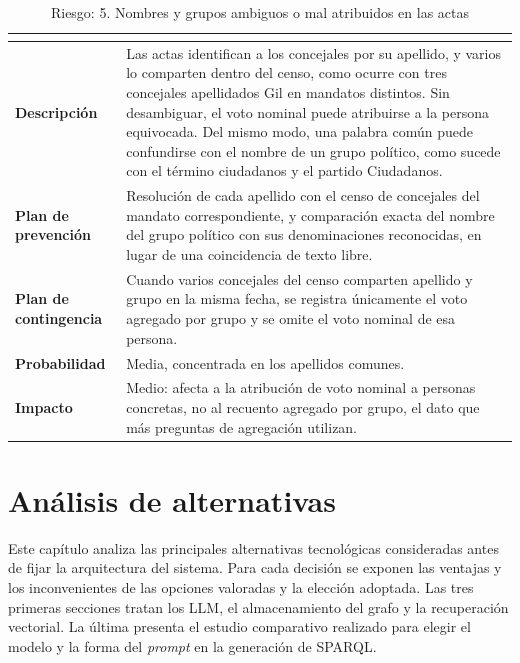 \documentclass[11pt, a4paper]{report}
\begin{document}
	\begin{table}[H]
		\centering
		\begin{tabularx}{\linewidth}{|>{\bfseries}l|X|}
			\hline
			\rowcolor{riesgo-header}
			\multicolumn{2}{|c|}{\textcolor{white}{\textbf{5. Nombres y grupos ambiguos o mal atribuidos en las actas}}} \\
			\hline
			Descripción & Las actas identifican a los concejales por su apellido, y varios lo comparten dentro del censo, como ocurre con tres concejales apellidados Gil en mandatos distintos. Sin desambiguar, el voto nominal puede atribuirse a la persona equivocada. Del mismo modo, una palabra común puede confundirse con el nombre de un grupo político, como sucede con el término ciudadanos y el partido Ciudadanos. \\
			\hline
			\rowcolor{fila-alterna}
			Plan de prevención & Resolución de cada apellido con el censo de concejales del mandato correspondiente, y comparación exacta del nombre del grupo político con sus denominaciones reconocidas, en lugar de una coincidencia de texto libre. \\
			\hline
			Plan de contingencia & Cuando varios concejales del censo comparten apellido y grupo en la misma fecha, se registra únicamente el voto agregado por grupo y se omite el voto nominal de esa persona. \\
			\hline
			\rowcolor{fila-alterna}
			Probabilidad & Media, concentrada en los apellidos comunes. \\
			\hline
			Impacto & Medio: afecta a la atribución de voto nominal a personas
			concretas, no al recuento agregado por grupo, el dato que más preguntas de agregación utilizan. \\
			\hline
		\end{tabularx}
		\caption{Riesgo: 5. Nombres y grupos ambiguos o mal atribuidos en las actas}
		\label{tab:riesgo-nombres}
	\end{table}

	\chapter{Análisis de alternativas}
	\label{ch:alternativas}

	Este capítulo analiza las principales alternativas tecnológicas consideradas
	antes de fijar la arquitectura del sistema. Para cada decisión se exponen las
	ventajas y los inconvenientes de las opciones valoradas y la elección
	adoptada. Las tres primeras secciones tratan los LLM, el
	almacenamiento del grafo y la recuperación vectorial. La última presenta el
	estudio comparativo realizado para elegir el modelo y la forma del
	\textit{prompt} en la generación de SPARQL.
\end{document}
